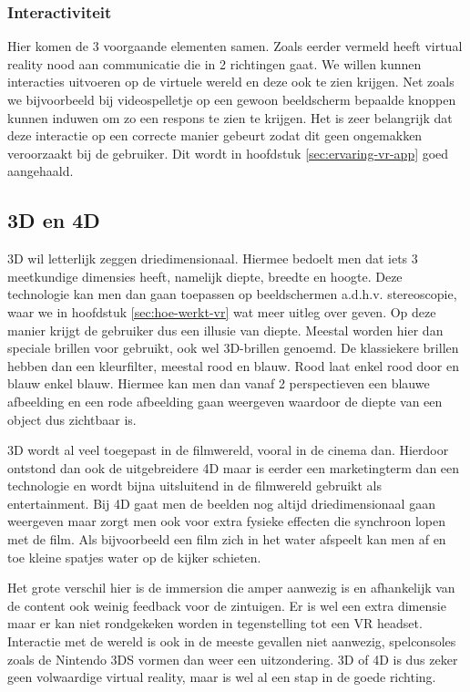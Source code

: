 \subsubsection{Interactiviteit}
\label{ssubsec:interactiviteit}
Hier komen de 3 voorgaande elementen samen. Zoals eerder vermeld heeft virtual reality nood aan communicatie die in 2 richtingen gaat. We willen kunnen interacties uitvoeren op de virtuele wereld en deze ook te zien krijgen. Net zoals we bijvoorbeeld bij videospelletje op een gewoon beeldscherm bepaalde knoppen kunnen induwen om zo een respons te zien te krijgen. Het is zeer belangrijk dat deze interactie op een correcte manier gebeurt zodat dit geen ongemakken veroorzaakt bij de gebruiker. Dit wordt in hoofdstuk \ref{sec:ervaring-vr-app} goed aangehaald.

\subsection{3D en 4D}
\label{subsec:3d-4d}
3D wil letterlijk zeggen driedimensionaal. Hiermee bedoelt men dat iets 3 meetkundige dimensies heeft, namelijk diepte, breedte en hoogte. Deze technologie kan men dan gaan toepassen op beeldschermen a.d.h.v. stereoscopie, waar we in hoofdstuk \ref{sec:hoe-werkt-vr} wat meer uitleg over geven. Op deze manier krijgt de gebruiker dus een illusie van diepte. Meestal worden hier dan speciale brillen voor gebruikt, ook wel 3D-brillen genoemd. De klassiekere brillen hebben dan een kleurfilter, meestal rood en blauw. Rood laat enkel rood door en blauw enkel blauw. Hiermee kan men dan vanaf 2 perspectieven een blauwe afbeelding en een rode afbeelding gaan weergeven waardoor de diepte van een object dus zichtbaar is.

3D wordt al veel toegepast in de filmwereld, vooral in de cinema dan. Hierdoor ontstond dan ook de uitgebreidere 4D maar is eerder een marketingterm dan een technologie en wordt bijna uitsluitend in de filmwereld gebruikt als entertainment. Bij 4D gaat men de beelden nog altijd driedimensionaal gaan weergeven maar zorgt men ook voor extra fysieke effecten die synchroon lopen met de film. Als bijvoorbeeld een film zich in het water afspeelt kan men af en toe kleine spatjes water op de kijker schieten.

Het grote verschil hier is de immersion die amper aanwezig is en afhankelijk van de content ook weinig feedback voor de zintuigen. Er is wel een extra dimensie maar er kan niet rondgekeken worden in tegenstelling tot een VR headset. Interactie met de wereld is ook in de meeste gevallen niet aanwezig, spelconsoles zoals de Nintendo 3DS vormen dan weer een uitzondering. 3D of 4D is dus zeker geen volwaardige virtual reality, maar is wel al een stap in de goede richting.

